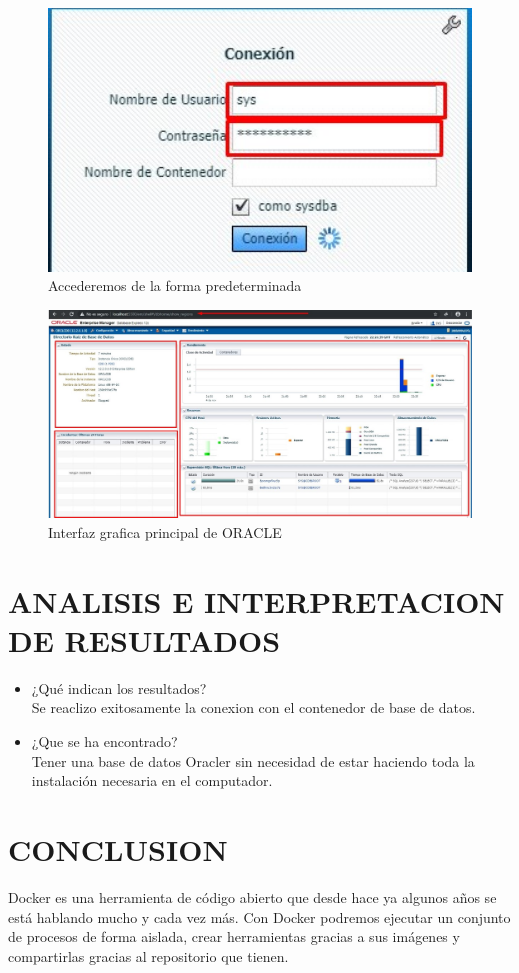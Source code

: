 \documentclass[preprint,12pt]{elsarticle}
\begin{document}
\begin{figure}[H]
	\begin{center}
		\includegraphics[width=12cm]{./IMAGENES/foto14} 
		\caption{Accederemos de la forma predeterminada}
	\end{center}
\end{figure}

\begin{figure}[H]
	\begin{center}
		\includegraphics[width=13cm]{./IMAGENES/foto15} 
		\caption{Interfaz grafica principal de ORACLE}
	\end{center}
\end{figure}


\section{ANALISIS E INTERPRETACION DE RESULTADOS }
\begin{itemize}
	\item ¿Qué indican los resultados? \\
	Se reaclizo exitosamente la conexion con el contenedor de base de datos.
	\item ¿Que se ha encontrado?\\
	Tener una base de datos Oracler sin necesidad de estar haciendo toda la instalación necesaria en el computador.
\end{itemize}


\section{CONCLUSION}
Docker es una herramienta de código abierto que desde hace ya algunos años se está hablando mucho y cada vez más. Con Docker podremos ejecutar un conjunto de procesos de forma aislada, crear herramientas gracias a sus imágenes y compartirlas gracias al repositorio que tienen.
\end{document}
